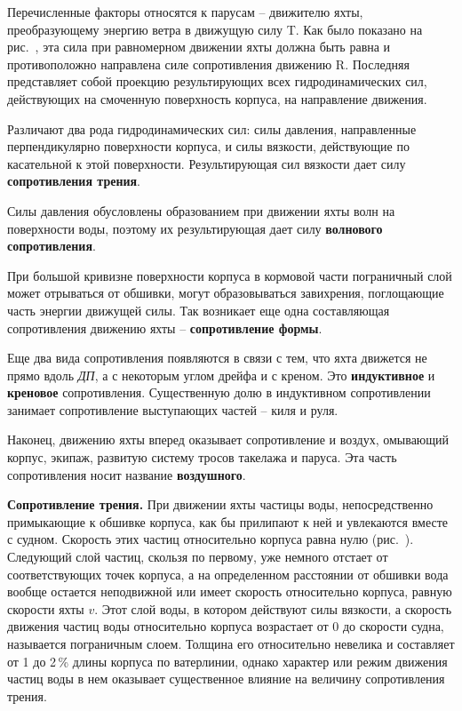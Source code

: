 Перечисленные факторы относятся к парусам \--- движителю яхты, преобразующему энергию ветра в движущую силу \ve T. Как было показано на рис.~, эта сила при равномерном движении яхты должна быть равна и противоположно направлена силе сопротивления движению \ve R. Последняя представляет собой проекцию результирующих всех гидродинамических сил, действующих на смоченную поверхность корпуса, на направление движения.

Различают два рода гидродинамических сил: силы давления, направленные перпендикулярно поверхности корпуса, и силы вязкости, действующие по касательной к этой поверхности. Результирующая сил вязкости дает силу \textbf{сопротивления трения}. 

Силы давления обусловлены образованием при движении яхты волн на поверхности воды, поэтому их результирующая дает силу \textbf{волнового сопротивления}. 

При большой кривизне поверхности корпуса в кормовой части пограничный слой может отрываться от обшивки, могут образовываться завихрения, поглощающие часть энергии движущей силы. Так возникает еще одна составляющая сопротивления движению яхты \--- \textbf{сопротивление формы}.

Еще два вида сопротивления появляются в связи с тем, что яхта движется не прямо вдоль \textit{ДП}, а с некоторым углом дрейфа и с креном. Это \textbf{индуктивное} и \textbf{креновое} сопротивления. Существенную долю в индуктивном сопротивлении занимает сопротивление выступающих частей \--- киля и руля.

Наконец, движению яхты вперед оказывает сопротивление и воздух, омывающий корпус, экипаж, развитую систему тросов такелажа и паруса. Эта часть сопротивления носит название \textbf{воздушного}. 

\textbf{Сопротивление трения.} При движении яхты частицы воды, непосредственно примыкающие к обшивке корпуса, как бы прилипают к ней и увлекаются вместе с судном. Скорость этих частиц относительно корпуса равна нулю (рис.~). Следующий слой частиц, скользя по первому, уже немного отстает от соответствующих точек корпуса, а на определенном расстоянии от обшивки вода вообще остается неподвижной или имеет скорость относительно корпуса, равную скорости яхты $v$. Этот слой воды, в котором действуют силы вязкости, а скорость движения частиц воды относительно корпуса возрастает от 0 до скорости судна, называется пограничным слоем. Толщина его относительно невелика и составляет от 1 до 2\,\% длины корпуса по ватерлинии, однако характер или режим движения частиц воды в нем оказывает существенное влияние на величину сопротивления трения.

